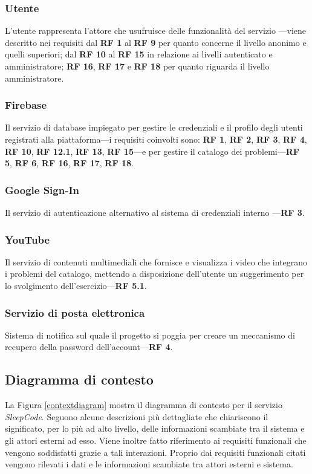 \documentclass[11pt, a4paper]{article}
\theoremstyle{definition} %
\begin{document}
\subsubsection{Utente}
L'utente rappresenta l'attore che usufruisce delle funzionalità del servizio
—viene descritto nei requisiti dal \textbf{RF 1} al \textbf{RF 9} per quanto
concerne il livello anonimo e quelli superiori; dal \textbf{RF 10} al
\textbf{RF 15} in relazione ai livelli autenticato e amministratore; \textbf{RF 16},
\textbf{RF 17} e \textbf{RF 18} per quanto riguarda il livello amministratore.

\subsubsection{Firebase}
Il servizio di database impiegato per gestire le credenziali e il profilo
degli utenti registrati alla piattaforma—i requisiti coinvolti sono: \textbf{RF 1},
\textbf{RF 2}, \textbf{RF 3}, \textbf{RF 4}, \textbf{RF 10}, \textbf{RF 12.1},
\textbf{RF 13}, \textbf{RF 15}—e per gestire il catalogo dei problemi—\textbf{RF 5}, \textbf{RF 6},
\textbf{RF 16}, \textbf{RF 17}, \textbf{RF 18}.

\subsubsection{Google Sign-In}
Il servizio di autenticazione alternativo al sistema di credenziali interno
—\textbf{RF 3}.

\subsubsection{YouTube}
Il servizio di contenuti multimediali che fornisce e visualizza i video
che integrano i problemi del catalogo, mettendo a disposizione dell'utente
un suggerimento per lo svolgimento dell'esercizio—\textbf{RF 5.1}.

\subsubsection{Servizio di posta elettronica}
Sistema di notifica sul quale il progetto si poggia per creare un
meccanismo di recupero della password dell'account—\textbf{RF 4}.

\newpage
\subsection{Diagramma di contesto} %
La Figura \ref{contextdiagram} mostra il diagramma di contesto per il
servizio \textit{SleepCode}. Seguono alcune descrizioni più dettagliate
che chiariscono il significato, per lo più ad alto livello, delle
informazioni scambiate tra il sistema e gli attori esterni ad esso.
Viene inoltre fatto riferimento ai requisiti funzionali che vengono
soddisfatti grazie a tali interazioni. Proprio dai requisiti funzionali
citati vengono rilevati i dati e le informazioni scambiate tra attori
esterni e sistema.
\end{document}
